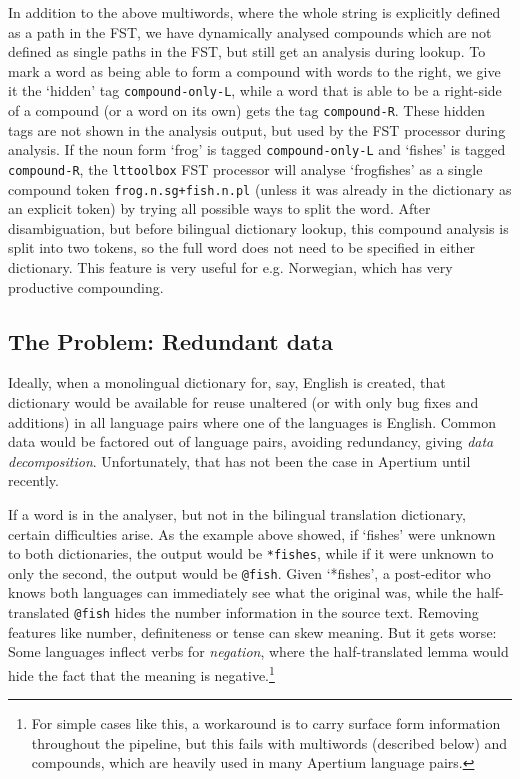 \documentclass[10pt, a4paper]{article}
\newcommand{\ana}[1]{\texttt{#1}}
\newcommand{\f}[1]{`#1'}
\newcommand{\tool}[1]{\texttt{#1}}
\begin{document}
In addition to the above multiwords, where the whole string is
explicitly defined as a path in the FST, we have dynamically analysed
compounds which are not defined as single paths in the FST, but still
get an analysis during lookup. To mark a word as being able to form a
compound with words to the right, we give it the \f{hidden} tag
\ana{compound-only-L}, while a word that is able to be a right-side of
a compound (or a word on its own) gets the tag \ana{compound-R}.
These hidden tags are not shown in the analysis output, but used by
the FST processor during analysis. If the noun form \f{frog} is tagged
\ana{compound-only-L} and \f{fishes} is tagged \ana{compound-R}, the
\tool{lttoolbox} FST processor will analyse \f{frogfishes} as a single
compound token \ana{frog.n.sg+fish.n.pl} (unless it was already in the
dictionary as an explicit token) by trying all possible ways to split
the word. After disambiguation, but before bilingual dictionary
lookup, this compound analysis is split into two tokens, so the full
word does not need to be specified in either dictionary. This feature
is very useful for e.g.  Norwegian, which has very productive
compounding.

\subsection{The Problem: Redundant data}
\label{sec:problem}

Ideally, when a monolingual dictionary for, say, English is created,
that dictionary would be available for reuse unaltered (or with only
bug fixes and additions) in all language pairs where one of the
languages is English. Common data would be factored out of language
pairs, avoiding redundancy, giving \emph{data decomposition}.
Unfortunately, that has not been the case in Apertium until recently.

If a word is in the analyser, but not in the bilingual translation
dictionary, certain difficulties arise. As the example above showed,
if \f{fishes} were unknown to both dictionaries, the output would be
\ana{*fishes}, while if it were unknown to only the second, the output
would be \ana{@fish}. Given \f{*fishes}, a post-editor who knows both
languages can immediately see what the original was, while the
half-translated \ana{@fish} hides the number information in the source
text. Removing features like number, definiteness or tense can skew
meaning.  But it gets worse: Some languages inflect verbs for
\emph{negation}, where the half-translated lemma would hide the fact
that the meaning is negative.\footnote{For simple cases like this, a
  workaround is to carry surface form information throughout the
  pipeline, but this fails with multiwords (described below) and
  compounds, which are heavily used in many Apertium language
  pairs.}
\end{document}
